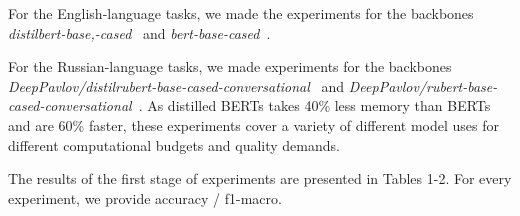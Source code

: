 \begin{itemize}
\begin{table*}
 \caption{Metrics for five dialog tasks. Acc stands for accuracy, F1 stands for F1 score, mode S stands for single-task, and mode M stands for multi-task(with plain sampling). Averaged by three runs.}
 \label{tab:mtl_dialog}
\centering
{}
 
For the English-language tasks, we made the experiments for the backbones \textit{distilbert-base,-cased}~\cite{distilbert} and \textit{bert-base-cased}~\cite{bert}. %

For the Russian-language tasks, we made experiments for the backbones \textit{DeepPavlov/distilrubert-base-cased-conversational}~\cite{distilrubert} and \textit{DeepPavlov/rubert-base-cased-conversational}~\cite{rubert}. As distilled BERTs takes 40\% less memory than BERTs and are 60\% faster, these experiments cover a variety of different model uses for different computational budgets and quality demands. 

The results of the first stage of experiments are presented in Tables 1-2. For every experiment, we provide accuracy / f1-macro. 


\end{table*}
\end{itemize}
